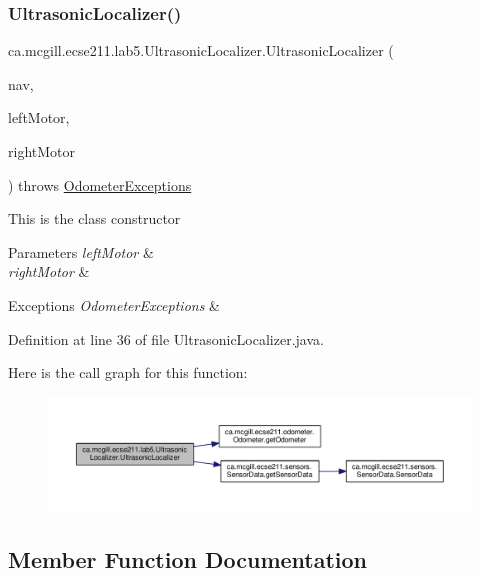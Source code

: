\subsubsection{\texorpdfstring{Ultrasonic\+Localizer()}{UltrasonicLocalizer()}}
{\footnotesize\ttfamily ca.\+mcgill.\+ecse211.\+lab5.\+Ultrasonic\+Localizer.\+Ultrasonic\+Localizer (\begin{DoxyParamCaption}\item[{\hyperlink{classca_1_1mcgill_1_1ecse211_1_1lab5_1_1_navigation}{Navigation}}]{nav,  }\item[{E\+V3\+Large\+Regulated\+Motor}]{left\+Motor,  }\item[{E\+V3\+Large\+Regulated\+Motor}]{right\+Motor }\end{DoxyParamCaption}) throws \hyperlink{classca_1_1mcgill_1_1ecse211_1_1odometer_1_1_odometer_exceptions}{Odometer\+Exceptions}}

This is the class constructor


\begin{DoxyParams}{Parameters}
{\em left\+Motor} & \\
\hline
{\em right\+Motor} & \\
\hline
\end{DoxyParams}

\begin{DoxyExceptions}{Exceptions}
{\em Odometer\+Exceptions} & \\
\hline
\end{DoxyExceptions}


Definition at line 36 of file Ultrasonic\+Localizer.\+java.

Here is the call graph for this function\+:\nopagebreak
\begin{figure}[H]
\begin{center}
\leavevmode
\includegraphics[width=350pt]{classca_1_1mcgill_1_1ecse211_1_1lab5_1_1_ultrasonic_localizer_a47c08f2d2ec2ba664867231ca62020da_cgraph}
\end{center}
\end{figure}


\subsection{Member Function Documentation}
\mbox{\label{classca_1_1mcgill_1_1ecse211_1_1lab5_1_1_ultrasonic_localizer_a7fd82ab7240a07ae6947313c0769d4bc}} 
